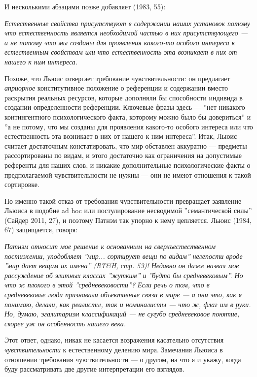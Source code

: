 \documentclass[11pt]{book}
\begin{document}
\smallskip

И несколькими абзацами позже добавляет (1983, 55):

\smallskip

\textit{Естественные свойства присутствуют в содержании наших установок потому что естественность является необходимой частью в них присутствующего --- а не потому что мы созданы для проявления какого-то особого интереса к естественным свойствам или что естественность эта возникает в них от нашего к ним интереса.}

\smallskip

Похоже, что Льюис отвергает требование чувствительности: он предлагает \textit{априорное} конститутивное положение о референции и содержании вместо раскрытия реальных ресурсов, которые дополняли бы способности индивида в создании определенности референции. Ключевые фразы здесь --- ''нет никакого контингентного психологического факта, которому можно было бы довериться'' и ''а не потому, что мы созданы для проявления какого-то особого интереса или что естественность эта возникает в них от нашего к ним интереса''. Итак, Льюис считает достаточным констатировать, что мир обставлен аккуратно --- предметы рассортированы по видам, и этого достаточно как ограничения на допустимые референты для наших слов, и никакие дополнительные психологические факты о предполагаемой чувствительности не нужны --- они не имеют отношения к такой сортировке.

Но именно такой отказ от требования чувствительности превращает заявление Льюиса в подобие ad hoc или постулирование несводимой ''семантической силы'' (Сайдер 2011, 27), и поэтому Патнэм так упорно к нему цепляется. Льюис (1984, 67) защищается, говоря:

\smallskip

\textit{Патнэм относит мое решение к основанным на сверхъестественном постижении, уподобляет ''мир... сортирует вещи по видам'' нелепости вроде ''мир дает вещам их имена'' (RT\&H, стр. 53)! Недавно он даже назвал мое рассуждение об элитных классах ''жутким'' и ''будто бы средневековым''. Но что ж плохого в этой ''средневековости''? Если речь о том, что в средневековье люди признавали объективные связи в мире --- а они это, как я понимаю, делали, как реалисты, так и номиналисты --- что ж, флаг им в руки. Но, думаю, эгалитаризм классификаций --- не сугубо средневековое понятие, скорее уж он особенность нашего века.}

\smallskip

Этот ответ, однако, никак не касается возражения касательно отсутствия \textit{чувствительности} к естественному делению мира. Замечания Льюиса в отношении требования чувствительности --- о другом, на что я и укажу, когда буду рассматривать две другие интерпретации его взглядов.
\end{document}
